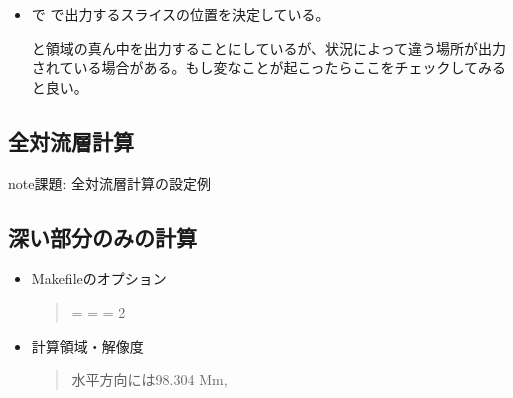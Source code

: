 \documentclass[letterpaper,10pt,dvipdfmx,report]{sphinxmanual}
\begin{document}
\begin{itemize}
\begin{description}
\end{description}

\item {} \begin{description}
\sphinxAtStartPar
{} で  で出力するスライスの位置を決定している。

\sphinxAtStartPar
と領域の真ん中を出力することにしているが、状況によって違う場所が出力されている場合がある。もし変なことが起こったらここをチェックしてみると良い。

\end{description}

\end{itemize}


\subsection{全対流層計算}
\label{\detokenize{typical_case:id9}}
\begin{sphinxadmonition}{note}{\label{\detokenize{typical_case:id10}}課題:}
\sphinxAtStartPar
全対流層計算の設定例
\end{sphinxadmonition}


\subsection{深い部分のみの計算}
\label{\detokenize{typical_case:id11}}\begin{itemize}
\item {} 
\sphinxAtStartPar
Makefileのオプション
\begin{quote}

\begin{sphinxVerbatim}[commandchars=\\\{\}]
 = \PYGZhy{} 
 = \PYGZhy{} 
 = \PYGZhy{}2 
\end{sphinxVerbatim}
\end{quote}

\item {} 
\sphinxAtStartPar
計算領域・解像度
\begin{quote}

\sphinxAtStartPar
水平方向には98.304 Mm,
\end{quote}

\end{itemize}
\end{document}

